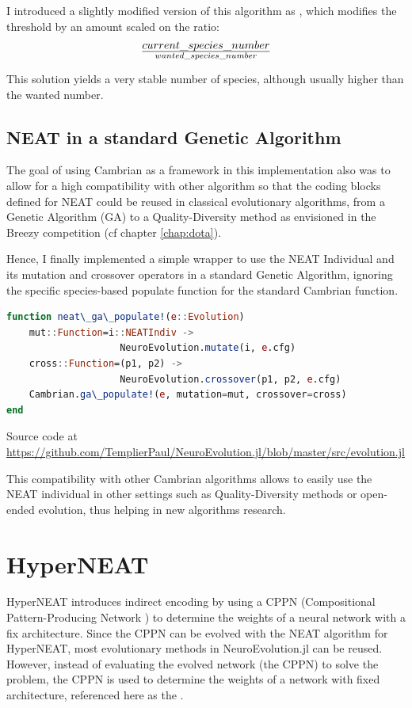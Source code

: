 I introduced a slightly modified version of this algorithm as , which modifies the threshold by an amount scaled on the ratio: $$current\_species\_number \over wanted\_species\_number$$

This solution yields a very stable number of species, although usually higher than the wanted number.

\subsection{NEAT in a standard Genetic Algorithm}

The goal of using Cambrian as a framework in this implementation also was to allow for a high compatibility with other algorithm so that the coding blocks defined for NEAT could be reused in classical evolutionary algorithms, from a Genetic Algorithm (GA) to a Quality-Diversity method as envisioned in the Breezy competition (cf chapter \ref{chap:dota}). 

Hence, I finally implemented a simple wrapper to use the NEAT Individual and its mutation and crossover operators in a standard Genetic Algorithm, ignoring the specific species-based populate function for the standard Cambrian  function.

\begin{minipage}{\linewidth}
\begin{lstlisting}[language=Julia, caption=Genetic Algorithm populate for NEAT]
function neat\_ga\_populate!(e::Evolution)
    mut::Function=i::NEATIndiv -> 
                    NeuroEvolution.mutate(i, e.cfg)
    cross::Function=(p1, p2) -> 
                    NeuroEvolution.crossover(p1, p2, e.cfg)
    Cambrian.ga\_populate!(e, mutation=mut, crossover=cross)
end
\end{lstlisting}
Source code at \url{https://github.com/TemplierPaul/NeuroEvolution.jl/blob/master/src/evolution.jl}\\
\end{minipage}

This compatibility with other Cambrian algorithms allows to easily use the NEAT individual in other settings such as Quality-Diversity methods or open-ended evolution, thus helping in new algorithms research.

\section{HyperNEAT}
HyperNEAT \cite{HyperNEAT} introduces indirect encoding by using a CPPN (Compositional Pattern-Producing Network \cite{CPPN}) to determine the weights of a neural network with a fix architecture. Since the CPPN can be evolved with the NEAT algorithm for HyperNEAT, most evolutionary methods in NeuroEvolution.jl can be reused. \\ 
However, instead of evaluating the evolved network (the CPPN) to solve the problem, the CPPN is used to determine the weights of a network with fixed architecture, referenced here as the . 

